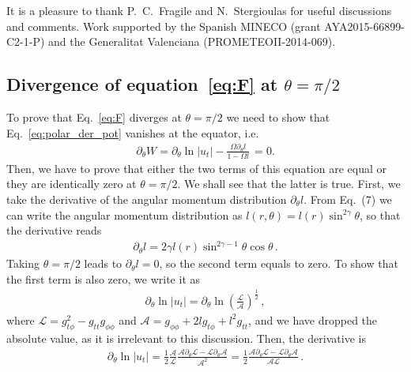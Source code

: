 \documentclass{aa}
\begin{document}
\begin{acknowledgements}
It is a pleasure to thank P.~C.~Fragile and N.~Stergioulas for useful discussions and comments. Work supported by the Spanish MINECO (grant AYA2015-66899-C2-1-P) and the Generalitat Valenciana (PROMETEOII-2014-069).
\end{acknowledgements}




\begin{appendix}
\section{Divergence of equation~\eqref{eq:F} at $\theta = \pi/2$}\label{div_partial_W}
To prove that Eq.~\eqref{eq:F} diverges at $\theta = \pi/2$ we need to show that
Eq.~\eqref{eq:polar_der_pot} vanishes at the equator, i.e.
\begin{eqnarray}
\partial_{\theta} W = \partial_{\theta} \ln|u_t| - \frac{\Omega \partial_{\theta}l}{1 - \Omega l}\, = 0.
\end{eqnarray}
Then, we have to prove that either the two terms of this equation are equal or they are identically zero at $\theta = \pi/2$. We shall see that the latter is true.
First, we take the derivative of the angular momentum distribution $\partial_{\theta} l$. From Eq.~(7) we can write the angular momentum distribution as $l(r, \theta) = l(r) \sin^{2\gamma} \theta$, so that the derivative reads
\begin{eqnarray}
\partial_{\theta} l = 2\gamma l(r) \sin^{2\gamma - 1} \theta \cos \theta \,.
\end{eqnarray}
Taking $\theta = \pi/2$ leads to $\partial_{\theta} l = 0$, so the second term equals to zero.
To show that the first term is also zero, we write it as
\begin{eqnarray}
\partial_{\theta} \ln|u_t| = \partial_{\theta} \ln \left(\frac{\mathcal{L}}{\mathcal{A}}\right)^{\frac{1}{2}}\,,
\end{eqnarray}
where $\mathcal{L} = g_{t \phi}^2 - g_{tt} g_{\phi\phi}$ and $\mathcal{A} = g_{\phi\phi} + 2 l g_{t\phi} + l^2g_{tt}$, and we have dropped the absolute value, as it is irrelevant to this discussion. Then, the derivative is
\begin{eqnarray}
\partial_{\theta} \ln|u_t| = \frac{1}{2} \frac{\mathcal{A}}{\mathcal{L}}\frac{\mathcal{A}\partial_{\theta}{\mathcal{L}} - \mathcal{L}\partial_{\theta}\mathcal{A}}{\mathcal{A}^2} = \frac{1}{2} \frac{\mathcal{A}\partial_{\theta}{\mathcal{L}} - \mathcal{L}\partial_{\theta}\mathcal{A}}{\mathcal{A} \mathcal{L}}\,.

\end{eqnarray}
\end{appendix}
\end{document}
